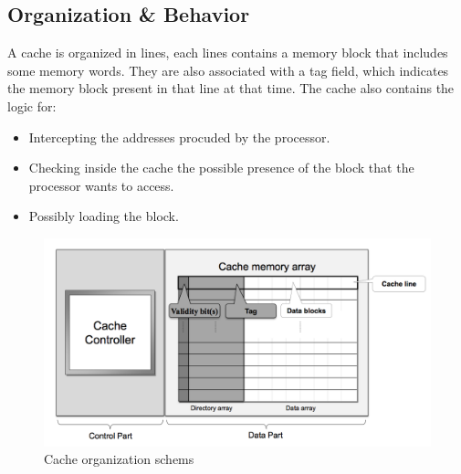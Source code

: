 \documentclass[12pt]{article}
\begin{document}
\subsection{Organization \& Behavior}
A cache is organized in lines, each lines contains a memory block that includes some memory words. They are also associated with a tag field, which indicates the memory block present in that line at that time. The cache also contains the logic for:
\begin{itemize}
  \item Intercepting the addresses procuded by the processor.
  \item Checking inside the cache the possible presence of the block that the processor wants to access.
  \item Possibly loading the block.
\end{itemize}
\begin{figure}[h!]
  \includegraphics[width=\linewidth]{images/cacheOrg.png}
  \caption{Cache organization schems}
  \label{fig:cacheOrg}
\end{figure}
\end{document}
